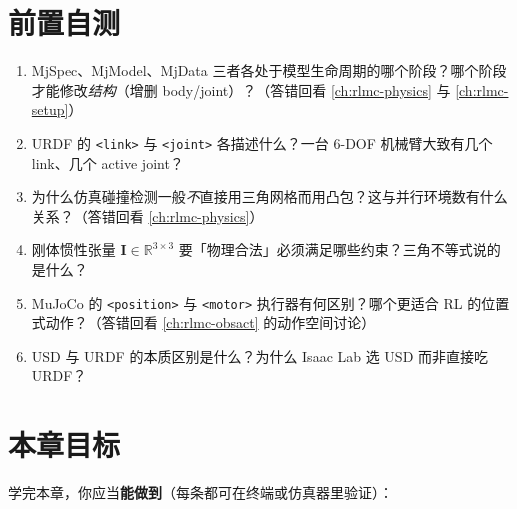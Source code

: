 \section*{前置自测}
\label{sec:rlmc-assets-selftest}

\begin{practice}
\begin{enumerate}
  \item MjSpec、MjModel、MjData 三者各处于模型生命周期的哪个阶段？哪个阶段才能修改\emph{结构}（增删 body/joint）？（答错回看 \cref{ch:rlmc-physics} 与 \cref{ch:rlmc-setup}）
  \item URDF 的 \texttt{<link>} 与 \texttt{<joint>} 各描述什么？一台 6-DOF 机械臂大致有几个 link、几个 active joint？
  \item 为什么仿真碰撞检测一般\emph{不}直接用三角网格而用凸包？这与并行环境数有什么关系？（答错回看 \cref{ch:rlmc-physics}）
  \item 刚体惯性张量 $\mathbf{I}\in\mathbb{R}^{3\times3}$ 要「物理合法」必须满足哪些约束？三角不等式说的是什么？
  \item MuJoCo 的 \texttt{<position>} 与 \texttt{<motor>} 执行器有何区别？哪个更适合 RL 的位置式动作？（答错回看 \cref{ch:rlmc-obsact} 的动作空间讨论）
  \item USD 与 URDF 的本质区别是什么？为什么 Isaac Lab 选 USD 而非直接吃 URDF？
\end{enumerate}
\end{practice}

\section*{本章目标}
\label{sec:rlmc-assets-goals}

学完本章，你应当\textbf{能做到}（每条都可在终端或仿真器里验证）：

